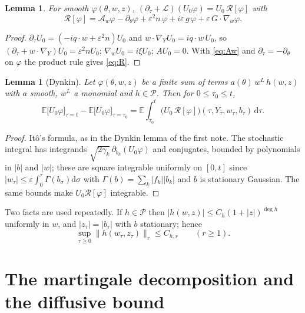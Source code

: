 \documentclass[11pt]{article}
\newcommand{\dd}{\mathrm{d}}
\newcommand{\E}{\mathbb{E}}
\newcommand{\eps}{\varepsilon}
\newcommand{\cL}{\mathcal{L}}
\newcommand{\cA}{\mathcal{A}}
\newcommand{\cR}{\mathcal{R}}
\newcommand{\cP}{\mathcal{P}}
\newcommand{\nrm}[2]{\|#1\|_{#2}}
\newtheorem{lemma}[theorem]{Lemma}
\theoremstyle{remark}
\begin{document}
\begin{lemma}\label{lem:R}
For smooth $\varphi(\theta,w,z)$,
$(\partial_\tau+\cL)(U_0\varphi) = U_0\,\cR[\varphi]$ with
\begin{equation}
  \cR[\varphi] = \cA_w\varphi - \partial_\theta\varphi
     + \eps^2n\,\varphi + i\eps\,g\,\varphi + \eps\,G\cdot\nabla_w\varphi .
  \label{eq:R}
\end{equation}
\end{lemma}

\begin{proof}
$\partial_\tau U_0 = (-iq\cdot w + \eps^2n)U_0$ and
$w\cdot\nabla_YU_0 = iq\cdot w\,U_0$, so
$(\partial_\tau + w\cdot\nabla_Y)U_0 = \eps^2nU_0$; $\nabla_wU_0 = i\xi U_0$;
$AU_0 = 0$. With \eqref{eq:Aw} and $\partial_\tau = -\partial_\theta$ on
$\varphi$ the product rule gives \eqref{eq:R}.
\end{proof}

\begin{lemma}[Dynkin]\label{lem:dynkin}
Let $\varphi(\theta,w,z)$ be a finite sum of terms
$a(\theta)\,w^L\,h(w,z)$ with $a$ smooth, $w^L$ a monomial and $h\in\cP$.
Then for $0\le\tau_0\le t$,
\[
  \E\bigl[U_0\varphi\bigr]_{\tau=t} - \E\bigl[U_0\varphi\bigr]_{\tau=\tau_0}
  = \E\int_{\tau_0}^t\bigl(U_0\,\cR[\varphi]\bigr)(\tau,Y_\tau,w_\tau,b_\tau)\,\dd\tau .
\]
\end{lemma}

\begin{proof}
It\^o's formula, as in the Dynkin lemma of the first note. The stochastic integral has
integrands $\sqrt{2\gamma_k}\,\partial_{b_k}(U_0\varphi)$ and conjugates,
bounded by polynomials in $|b|$ and $|w|$; these are square integrable
uniformly on $[0,t]$ since $|w_\tau|\le\eps\int_0^\tau\Gamma(b_\sigma)\dd\sigma$
with $\Gamma(b) = \sum_k|f_k||b_k|$ and $b$ is stationary Gaussian. The same
bounds make $U_0\cR[\varphi]$ integrable.
\end{proof}

Two facts are used repeatedly. If $h\in\cP$ then
$|h(w,z)|\le C_h(1+|z|)^{\deg h}$ uniformly in $w$, and $|z_\tau| = |b_\tau|$
with $b$ stationary; hence
\begin{equation}
  \sup_{\tau\ge0}\nrm{h(w_\tau,z_\tau)}{r}\le C_{h,r}\qquad(r\ge1).
  \label{eq:hbound}
\end{equation}

\section{The martingale decomposition and the diffusive bound}
\end{document}
